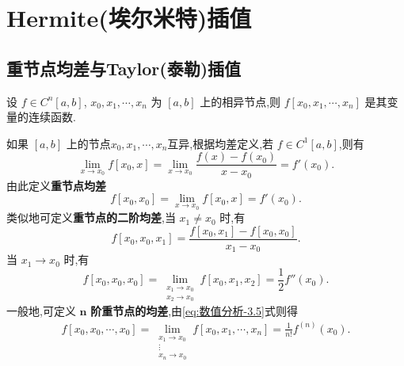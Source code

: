 \documentclass[../../main.tex]{subfiles}
\begin{document}
\section{Hermite(埃尔米特)插值}

\subsection{重节点均差与Taylor(泰勒)插值}

\begin{theorem}
设 $f \in C^n[a, b]$, $x_0, x_1, \cdots, x_n$ 为 $[a, b]$ 上的相异节点,则 $f[x_0, x_1, \cdots, x_n]$ 是其变量的连续函数.
\end{theorem}

\begin{definition}[重节点均差]
如果 $[a, b]$ 上的节点$x_0,x_1,\cdots,x_n$互异,根据均差定义,若 $f \in C^1[a, b]$,则有
\[
\lim_{x \to x_0} f[x_0, x] = \lim_{x \to x_0} \frac{f(x) - f(x_0)}{x - x_0} = f'(x_0).
\]
由此定义\textbf{重节点均差}
\[
f[x_0, x_0] = \lim_{x \to x_0} f[x_0, x] = f'(x_0).
\]
类似地可定义\textbf{重节点的二阶均差},当 $x_1 \neq x_0$ 时,有
\[
f[x_0, x_0, x_1] = \frac{f[x_0, x_1] - f[x_0, x_0]}{x_1 - x_0}.
\]
当 $x_1 \to x_0$ 时,有
\[
f[x_0, x_0, x_0] = \lim_{\substack{x_1 \to x_0 \\ x_2 \to x_0}} f[x_0, x_1, x_2] = \frac{1}{2} f''(x_0).
\]
一般地,可定义 $\boldsymbol{n}$ \textbf{阶重节点的均差},由\eqref{eq:数值分析-3.5}式则得
\begin{align}
f[x_0, x_0, \cdots, x_0] = \lim_{\substack{x_1 \to x_0 \\ \vdots \\ x_n \to x_0}} f[x_0, x_1, \cdots, x_n] = \frac{1}{n!} f^{(n)}(x_0). \label{eq:数值分析-4.1}
\end{align}
\end{definition}
\end{document}
